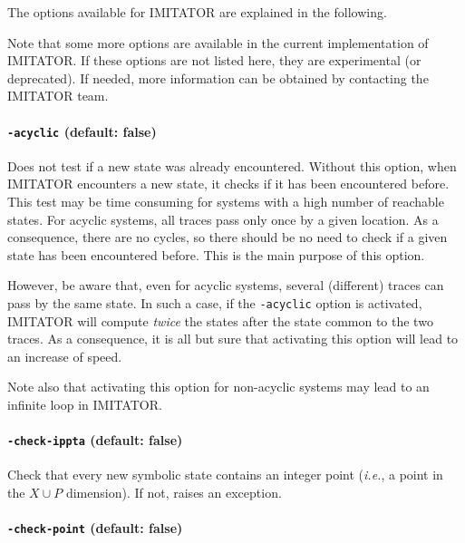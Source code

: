 \documentclass[a4paper,11pt]{report}
\newcommand{\Clock}{X} %
\newcommand{\Param}{P} %
\newcommand{\imitator}{\textsf{IMITATOR}}
\newcommand{\styleOption}[1]{\textcolor{optioncolor}{\texttt{#1}}}
\newcommand{\ie}{\textcolor{colorok}{\textit{i.e.}, }}
\begin{document}
The options available for \imitator{} are explained in the following.

Note that some more options are available in the current implementation of \imitator{}.
If these options are not listed here, they are experimental (or deprecated).
If needed, more information can be obtained by contacting the \imitator{} team.


\paragraph{\styleOption{-acyclic} (default: false)}
Does not test if a new state was already encountered.
Without this option, when \imitator{} encounters a new state, it checks if it has been encountered before.
This test may be time consuming for systems with a high number of reachable states.
For acyclic systems, all traces pass only once by a given location.
As a consequence, there are no cycles, so there should be no need to check if a given state has been encountered before.
This is the main purpose of this option.

However, be aware that, even for acyclic systems, several (different) traces can pass by the same state.
In such a case, if the \styleOption{-acyclic} option is activated, \imitator{} will compute \emph{twice} the states after the state common to the two traces.
As a consequence, it is all but sure that activating this option will lead to an increase of speed.

Note also that activating this option for non-acyclic systems may lead to an infinite loop in \imitator{}.


\paragraph{\styleOption{-check-ippta} (default: false)}

Check that every new symbolic state contains an integer point (\ie{} a point in the $\Clock \cup \Param$ dimension).
If not, raises an exception.


\paragraph{\styleOption{-check-point} (default: false)}
\end{document}
